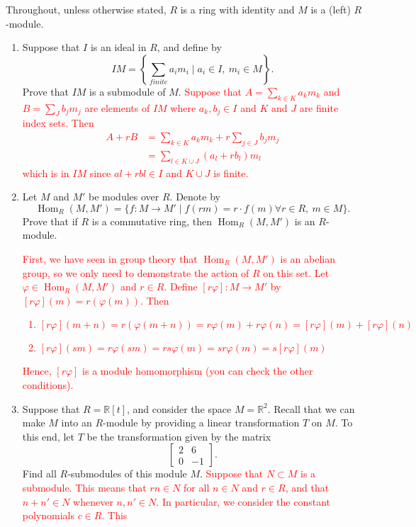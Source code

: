 \documentclass[12pt]{article}
\newcommand{\bbR}{\mathbb{R}}
\newcommand{\Hom}{\operatorname{Hom}}
\newcommand{\solution}[1]{\textcolor{red}{#1}}
\begin{document}
\pagestyle{fancy}

Throughout, unless otherwise stated, $R$ is a ring with identity and
$M$ is a (left) $R$-module.

\begin{enumerate}
\item Suppose that $I$ is an ideal in $R$, and define by 
  \[IM=\left\{\sum\limits_{finite} a_i m_i \mid a_i\in I,\ m_i\in
      M\right\}.\] Prove that $IM$ is a submodule of $M$.
\solution{
Suppose that $A=\sum_{k\in K} a_k m_k$ and $B=\sum_J b_j m_j$ are elements of
$IM$ where $a_k, b_j\in I$ and $K$ and $J$ are finite index sets. Then
\begin{align*}
  A+rB &= \sum_{k\in K} a_k m_k + r\sum_{j\in J} b_j m_j\\
&= \sum_{l \in K\cup J} (a_l+rb_l)m_l
\end{align*}
which is in $IM$ since $al+rbl\in I$ and $K\cup J$ is finite. 
} 
\item Let $M$ and $M'$ be modules over $R$. Denote by 
  \[\Hom_{R}(M,M')=\{f: M\rightarrow M' \mid
    f(rm)=r\cdot f(m) \forall r\in R,\ m\in M\}.\] Prove that if
  $R$ is a commutative ring, then $\Hom_R(M,M')$ is an $R$-module. 
\solution{
First, we have seen in group theory that $\Hom_R(M,M')$ is an abelian
group, so we only need to demonstrate the action of $R$ on this
set. Let $\varphi\in \Hom_R(M,M')$ and $r\in R$. Define $[r\varphi]:
M\rightarrow M'$ by $[r\varphi](m) = r (\varphi(m))$. Then
\begin{enumerate}
\item $[r\varphi](m+n) =
  r(\varphi(m+n))=r\varphi(m)+r\varphi(n)=[r\varphi](m)+[r\varphi](n)$
\item $[r\varphi](sm) = r\varphi(sm)=rs\varphi(m)=sr\varphi(m)=s[r\varphi](m)$
\end{enumerate}
Hence, $[r\varphi]$ is a module homomorphism (you can check the other conditions). }
\item Suppose that $R=\bbR[t]$, and consider the space
  $M=\bbR^2$. Recall that we can make $M$ into an $R$-module by
  providing a linear transformation $T$ on $M$. To this end, let $T$
  be the transformation given by the matrix 
  \[\begin{bmatrix} 2 & 6 \\ 0 & -1\end{bmatrix}.\] Find all
  $R$-submodules of this module $M$. 
\solution{
Suppose that $N\subset M$ is a submodule. This means that $rn\in N$
for all $n\in N$ and $r\in R$, and that $n+n'\in N$ whenever $n,n'\in
N$. In particular, we consider the constant polynomials $c\in R$. This
}
\end{enumerate}
\end{document}
